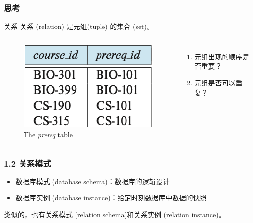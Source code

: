 \documentclass[aspectratio=169, 14pt]{beamer}
\begin{document}
\begin{frame}
	\frametitle{思考}
	\begin{block}{关系}
		关系 (relation) 是元组(tuple) 的集合 (set)。
	\end{block}

	\begin{columns}
		\begin{figure}
			\includegraphics[height=.35\paperheight]{table/prereq}
			\caption*{The \emph{prereq} table}
		\end{figure}
		\begin{enumerate}
			\item 元组出现的顺序是否重要？
			\item 元组是否可以重复？
		\end{enumerate}
	\end{columns}

\end{frame}

\begin{frame}
	\frametitle{1.2 关系模式}
	\begin{itemize}
		\item 数据库模式 (database schema)：数据库的逻辑设计
		\item 数据库实例 (database instance)：给定时刻数据库中数据的快照
	\end{itemize}
	类似的，也有关系模式 (relation schema)和关系实例 (relation instance)。

\end{frame}
\end{document}

